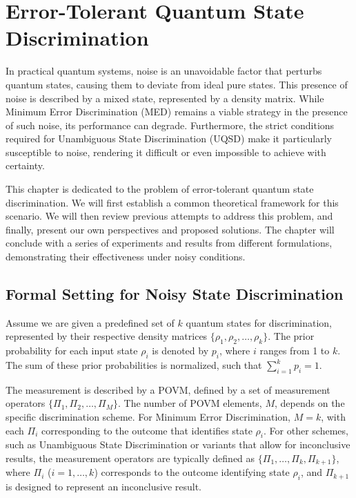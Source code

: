 
\chapter{Error-Tolerant Quantum State Discrimination}
\label{chap:error_uqsd}

In practical quantum systems, noise is an unavoidable factor that perturbs quantum states, causing them to deviate from ideal pure states.
This presence of noise is described by a mixed state, represented by a density matrix.
While Minimum Error Discrimination (MED) remains a viable strategy in the
presence of such noise, its performance can degrade.
Furthermore, the strict conditions required for Unambiguous State
Discrimination (UQSD) make it particularly susceptible to noise, rendering it
difficult or even impossible to achieve with certainty.

This chapter is dedicated to the problem of error-tolerant quantum state discrimination.
We will first establish a common theoretical framework for this scenario.
We will then review previous attempts to address this problem, and finally,
present our own perspectives and proposed solutions.
The chapter will conclude with a series of experiments and results from
different formulations, demonstrating their effectiveness under noisy conditions.

\section{Formal Setting for Noisy State Discrimination}
\label{sec:noisy_qsd_setting}
Assume we are given a predefined set of $k$ quantum states for discrimination,
represented by their respective density matrices $\{\rho_{1}, \rho_{2}, \dots, \rho_{k} \}$.
The prior probability for each input state $\rho_{i}$ is denoted by $p_{i}$,
where $i$ ranges from 1 to $k$. The sum of these prior probabilities is
normalized, such that $\sum_{i=1}^{k} p_{i} = 1$.

The measurement is described by a POVM, defined by a set of measurement
operators $\{\Pi_{1}, \Pi_{2}, \dots, \Pi_{M}\}$.
The number of POVM elements, $M$, depends on the specific discrimination scheme.
For Minimum Error Discrimination, $M=k$, with each $\Pi_{i}$ corresponding to
the outcome that identifies state $\rho_{i}$.
For other schemes, such as Unambiguous State Discrimination or variants that
allow for inconclusive results, the measurement operators are typically
defined as $\{\Pi_{1}, \dots, \Pi_{k}, \Pi_{k + 1}\}$, where
$\Pi_{i}$ ($i=1,\dots,k$) corresponds to the outcome identifying state $\rho_{i}$,
and $\Pi_{k+1}$ is designed to represent an inconclusive result.

